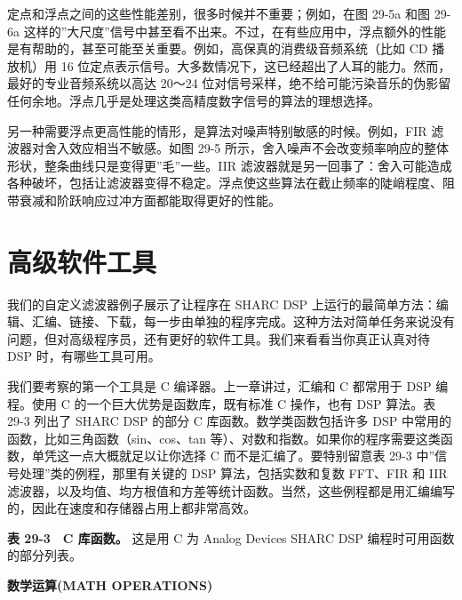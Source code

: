 定点和浮点之间的这些性能差别，很多时候并不重要；例如，在图 29-5a 和图
29-6a
这样的''大尺度''信号中甚至看不出来。不过，在有些应用中，浮点额外的性能是有帮助的，甚至可能至关重要。例如，高保真的消费级音频系统（比如
CD 播放机）用 16
位定点表示信号。大多数情况下，这已经超出了人耳的能力。然而，最好的专业音频系统以高达
20～24
位对信号采样，绝不给可能污染音乐的伪影留任何余地。浮点几乎是处理这类高精度数字信号的算法的理想选择。

另一种需要浮点更高性能的情形，是算法对噪声特别敏感的时候。例如，FIR
滤波器对舍入效应相当不敏感。如图 29-5
所示，舍入噪声不会改变频率响应的整体形状，整条曲线只是变得更''毛''一些。IIR
滤波器就是另一回事了：舍入可能造成各种破坏，包括让滤波器变得不稳定。浮点使这些算法在截止频率的陡峭程度、阻带衰减和阶跃响应过冲方面都能取得更好的性能。

\section{高级软件工具}

我们的自定义滤波器例子展示了让程序在 SHARC DSP
上运行的最简单方法：编辑、汇编、链接、下载，每一步由单独的程序完成。这种方法对简单任务来说没有问题，但对高级程序员，还有更好的软件工具。我们来看看当你真正认真对待
DSP 时，有哪些工具可用。

我们要考察的第一个工具是 C 编译器。上一章讲过，汇编和 C 都常用于 DSP
编程。使用 C 的一个巨大优势是函数库，既有标准 C 操作，也有 DSP 算法。表
29-3 列出了 SHARC DSP 的部分 C 库函数。数学类函数包括许多 DSP
中常用的函数，比如三角函数（sin、cos、tan
等）、对数和指数。如果你的程序需要这类函数，单凭这一点大概就足以让你选择
C 而不是汇编了。要特别留意表 29-3 中''信号处理''类的例程，那里有关键的
DSP 算法，包括实数和复数 FFT、FIR 和 IIR
滤波器，以及均值、均方根值和方差等统计函数。当然，这些例程都是用汇编编写的，因此在速度和存储器占用上都非常高效。

\textbf{表 29-3　C 库函数。} 这是用 C 为 Analog Devices SHARC DSP
编程时可用函数的部分列表。

\textbf{数学运算(MATH OPERATIONS)}

